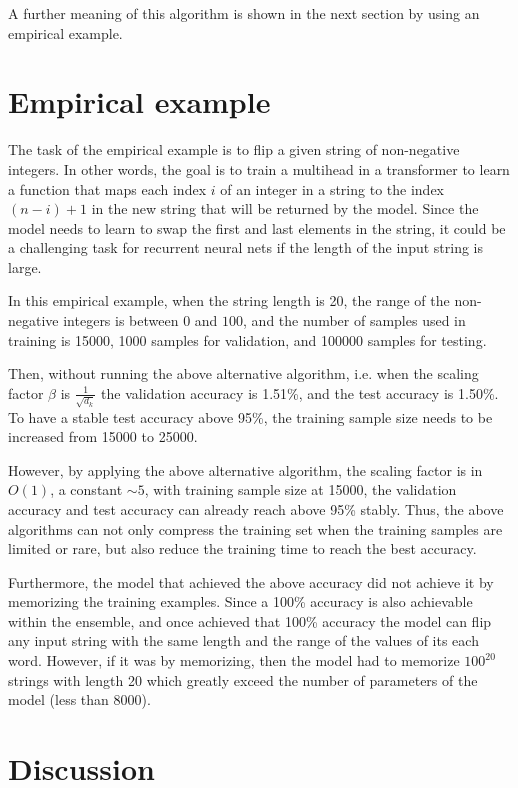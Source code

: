 \documentclass{article}
\theoremstyle{plain}
\theoremstyle{plain} %
\theoremstyle{definition}  %
\theoremstyle{remark}  %
\theoremstyle{plain}
\begin{document}
A further meaning of this algorithm is shown in the next section by using an empirical example.


\section{Empirical example}

The task of the empirical example is to flip a given string of non-negative integers. In other words, the goal is to train a multihead in a transformer to learn a function that maps each index $i$ of an integer in a string to the index $(n-i)+1$ in the new string that will be returned by the model. Since the model needs to learn to swap the first and last elements in the string, it could be a challenging task for recurrent neural nets if the length of the input string is large.

In this empirical example, when the string length is 20, the range of the non-negative integers is between $0$ and $100$, and the number of samples used in training is 15000, 1000 samples for validation, and 100000 samples for testing. 

Then, without running the above alternative algorithm, i.e. when the scaling factor $\beta$ is $\frac{1}{\sqrt{d_k}}$ the validation accuracy is 1.51\%, and the test accuracy is 1.50\%. To have a stable test accuracy above 95\%, the training sample size needs to be increased from 15000 to 25000.

However, by applying the above alternative algorithm, the scaling factor is in $O(1)$, a constant $\sim 5$, with training sample size at 15000, the validation accuracy and test accuracy can already reach above 95\% stably. Thus, the above algorithms can not only compress the training set when the training samples are limited or rare, but also reduce the training time to reach the best accuracy.

Furthermore, the model that achieved the above accuracy did not achieve it by memorizing the training examples. Since a 100\% accuracy is also achievable within the ensemble, and once achieved that 100\% accuracy the model can flip any input string with the same length and the range of the values of its each word. However, if it was by memorizing, then the model had to memorize $100^{20}$ strings with length 20 which greatly exceed the number of parameters of the model (less than 8000).

\section{Discussion}
\end{document}
